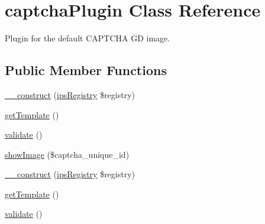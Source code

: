 \hypertarget{classcaptcha_plugin}{\section{captcha\-Plugin Class Reference}
\label{classcaptcha_plugin}
}


Plugin for the default C\-A\-P\-T\-C\-H\-A G\-D image.  


\subsection*{Public Member Functions}
\begin{DoxyCompactItemize}
\item 
\hyperlink{classcaptcha_plugin_a178c3a93e57e75dd87a5d39112af0b07}{\-\_\-\-\_\-construct} (\hyperlink{classips_registry}{ips\-Registry} \$registry)
\item 
\hyperlink{classcaptcha_plugin_a5d9dc4ee2d6563ea86a5d8f4d450d124}{get\-Template} ()
\item 
\hyperlink{classcaptcha_plugin_a184909dab34698899937d810a9f5d393}{validate} ()
\item 
\hyperlink{classcaptcha_plugin_aa508a30f76dfd44908dee448badebf81}{show\-Image} (\$captcha\-\_\-unique\-\_\-id)
\item 
\hyperlink{classcaptcha_plugin_a178c3a93e57e75dd87a5d39112af0b07}{\-\_\-\-\_\-construct} (\hyperlink{classips_registry}{ips\-Registry} \$registry)
\item 
\hyperlink{classcaptcha_plugin_a5d9dc4ee2d6563ea86a5d8f4d450d124}{get\-Template} ()
\item 
\hyperlink{classcaptcha_plugin_a184909dab34698899937d810a9f5d393}{validate} ()
\end{DoxyCompactItemize}
